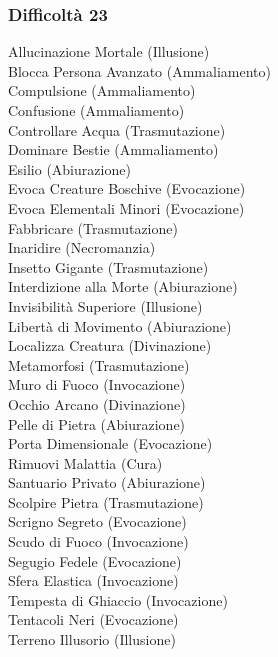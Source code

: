 \begin{multicols}{3}
	\subsubsection{Difficoltà 23}
	Allucinazione Mortale (Illusione)\\
	Blocca Persona Avanzato (Ammaliamento)\\
	Compulsione (Ammaliamento)\\
	Confusione (Ammaliamento)\\
	Controllare Acqua (Trasmutazione)\\
	Dominare Bestie (Ammaliamento)\\
	Esilio (Abiurazione)\\
	Evoca Creature Boschive (Evocazione)\\
	Evoca Elementali Minori (Evocazione)\\
	Fabbricare (Trasmutazione)\\
	Inaridire (Necromanzia)\\
	Insetto Gigante (Trasmutazione)\\
	Interdizione alla Morte (Abiurazione)\\
	Invisibilità Superiore (Illusione)\\
	Libertà di Movimento (Abiurazione)\\
	Localizza Creatura (Divinazione)\\
	Metamorfosi (Trasmutazione)\\
	Muro di Fuoco (Invocazione)\\
	Occhio Arcano (Divinazione)\\
	Pelle di Pietra (Abiurazione)\\
	Porta Dimensionale (Evocazione)\\
	Rimuovi Malattia (Cura)\\
	Santuario Privato (Abiurazione)\\
	Scolpire Pietra (Trasmutazione)\\
	Scrigno Segreto (Evocazione)\\
	Scudo di Fuoco (Invocazione)\\
	Segugio Fedele (Evocazione)\\
	Sfera Elastica (Invocazione)\\
	Tempesta di Ghiaccio (Invocazione)\\
	Tentacoli Neri (Evocazione)\\
	Terreno Illusorio (Illusione)\\
	

\end{multicols}
